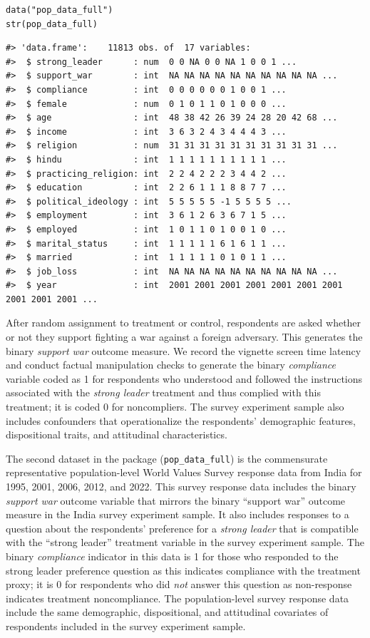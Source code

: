 \begin{verbatim}
data("pop_data_full")
str(pop_data_full)
\end{verbatim}

\begin{verbatim}
#> 'data.frame':    11813 obs. of  17 variables:
#>  $ strong_leader      : num  0 0 NA 0 0 NA 1 0 0 1 ...
#>  $ support_war        : int  NA NA NA NA NA NA NA NA NA NA ...
#>  $ compliance         : int  0 0 0 0 0 0 1 0 0 1 ...
#>  $ female             : num  0 1 0 1 1 0 1 0 0 0 ...
#>  $ age                : int  48 38 42 26 39 24 28 20 42 68 ...
#>  $ income             : int  3 6 3 2 4 3 4 4 4 3 ...
#>  $ religion           : num  31 31 31 31 31 31 31 31 31 31 ...
#>  $ hindu              : int  1 1 1 1 1 1 1 1 1 1 ...
#>  $ practicing_religion: int  2 2 4 2 2 2 3 4 4 2 ...
#>  $ education          : int  2 2 6 1 1 1 8 8 7 7 ...
#>  $ political_ideology : int  5 5 5 5 5 -1 5 5 5 5 ...
#>  $ employment         : int  3 6 1 2 6 3 6 7 1 5 ...
#>  $ employed           : int  1 0 1 1 0 1 0 0 1 0 ...
#>  $ marital_status     : int  1 1 1 1 1 6 1 6 1 1 ...
#>  $ married            : int  1 1 1 1 1 0 1 0 1 1 ...
#>  $ job_loss           : int  NA NA NA NA NA NA NA NA NA NA ...
#>  $ year               : int  2001 2001 2001 2001 2001 2001 2001 2001 2001 2001 ...
\end{verbatim}

After random assignment to treatment or control, respondents are asked
whether or not they support fighting a war against a foreign adversary.
This generates the binary \emph{support war} outcome measure. We record the
vignette screen time latency and conduct factual manipulation checks to
generate the binary \emph{compliance} variable coded as 1 for respondents who
understood and followed the instructions associated with the \emph{strong
leader} treatment and thus complied with this treatment; it is coded 0
for noncompliers. The survey experiment sample also includes confounders
that operationalize the respondents' demographic features, dispositional
traits, and attitudinal characteristics.

The second dataset in the package (\texttt{pop\_data\_full}) is the commensurate
representative population-level World Values Survey response data from
India for 1995, 2001, 2006, 2012, and 2022. This survey response data
includes the binary \emph{support war} outcome variable that mirrors the
binary ``support war'' outcome measure in the India survey experiment
sample. It also includes responses to a question about the respondents'
preference for a \emph{strong leader} that is compatible with the ``strong
leader'' treatment variable in the survey experiment sample. The binary
\emph{compliance} indicator in this data is 1 for those who responded to the
strong leader preference question as this indicates compliance with the
treatment proxy; it is 0 for respondents who did \emph{not} answer this
question as non-response indicates treatment noncompliance. The
population-level survey response data include the same demographic,
dispositional, and attitudinal covariates of respondents included in the
survey experiment sample.

